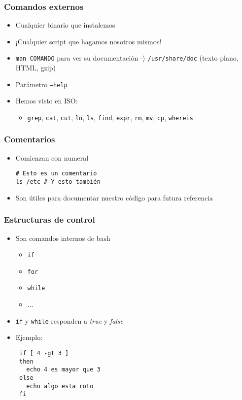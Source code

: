 \begin{frame}
  \frametitle{Comandos externos}
  \begin{itemize}
    \item Cualquier binario que instalemos
    \item ¡Cualquier script que hagamos nosotros mismos!
    \item \texttt{man COMANDO} para ver su documentación -$\rangle$ \texttt{/usr/share/doc} (texto plano, HTML, gzip)
    \item Parámetro \texttt{--help}
    \item Hemos visto en ISO:
    \begin{itemize}
      \item \texttt{grep}, \texttt{cat}, \texttt{cut}, \texttt{ln}, \texttt{ls},
        \texttt{find}, \texttt{expr}, \texttt{rm}, \texttt{mv}, \texttt{cp}, \texttt{whereis}
    \end{itemize}
  \end{itemize}
\end{frame}

\begin{frame}[fragile]
  \frametitle{Comentarios}
  \begin{itemize}
    \item Comienzan con numeral
    \begin{lstlisting}
# Esto es un comentario
ls /etc # Y esto también
    \end{lstlisting}
    \item Son útiles para documentar nuestro código para futura referencia
  \end{itemize}
\end{frame}

\begin{frame}[fragile]
  \frametitle{Estructuras de control}
  \begin{itemize}
    \item Son comandos internos de bash    
    \begin{itemize}
      \item \texttt{if}
      \item \texttt{for}
      \item \texttt{while}
      \item ...
    \end{itemize}
    \item \texttt{if} y \texttt{while} responden a \textit{true} y \textit{false}
    \item Ejemplo:
   \begin{lstlisting}
 if [ 4 -gt 3 ]
 then
   echo 4 es mayor que 3
 else
   echo algo esta roto
 fi
   \end{lstlisting}
  \end{itemize}
\end{frame}

